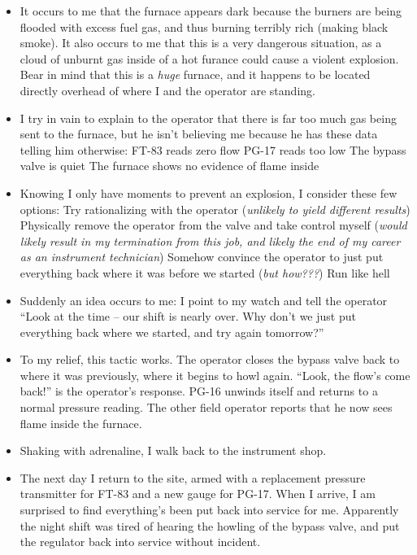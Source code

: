 \begin{itemize}
\vskip 10pt
\item{} It occurs to me that the furnace appears dark because the burners are being flooded with excess fuel gas, and thus burning terribly rich (making black smoke).  It also occurs to me that this is a very dangerous situation, as a cloud of unburnt gas inside of a hot furance could cause a violent explosion.  Bear in mind that this is a {\it huge} furnace, and it happens to be located directly overhead of where I and the operator are standing.
\vskip 10pt
\item{} I try in vain to explain to the operator that there is far too much gas being sent to the furnace, but he isn't believing me because he has these data telling him otherwise:
\itemitem{} FT-83 reads zero flow
\itemitem{} PG-17 reads too low
\itemitem{} The bypass valve is quiet
\itemitem{} The furnace shows no evidence of flame inside
\vskip 10pt
\item{} Knowing I only have moments to prevent an explosion, I consider these few options:
\itemitem{} Try rationalizing with the operator ({\it unlikely to yield different results})
\itemitem{} Physically remove the operator from the valve and take control myself ({\it would likely result in my termination from this job, and likely the end of my career as an instrument technician})
\itemitem{} Somehow convince the operator to just put everything back where it was before we started ({\it but how???})
\itemitem{} Run like hell
\vskip 10pt
\item{} Suddenly an idea occurs to me: I point to my watch and tell the operator ``Look at the time -- our shift is nearly over.  Why don't we just put everything back where we started, and try again tomorrow?''
\vskip 10pt
\item{} To my relief, this tactic works.  The operator closes the bypass valve back to where it was previously, where it begins to howl again.  ``Look, the flow's come back!'' is the operator's response.  PG-16 unwinds itself and returns to a normal pressure reading.  The other field operator reports that he now sees flame inside the furnace.
\vskip 10pt
\item{} Shaking with adrenaline, I walk back to the instrument shop.
\vskip 10pt
\item{} The next day I return to the site, armed with a replacement pressure transmitter for FT-83 and a new gauge for PG-17.  When I arrive, I am surprised to find everything's been put back into service for me.  Apparently the night shift was tired of hearing the howling of the bypass valve, and put the regulator back into service without incident.
\end{itemize}

